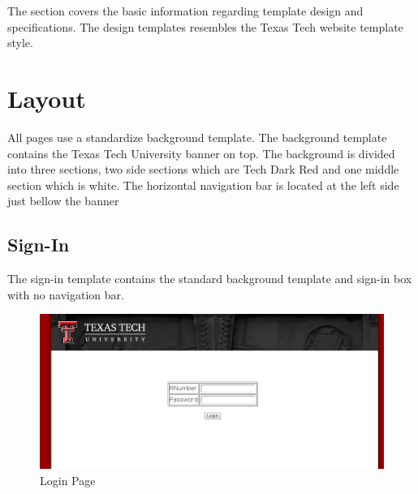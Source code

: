 The section covers the basic information regarding template design and specifications. The design templates resembles the Texas Tech website template style. 
\section{Layout}
All pages use a standardize background template. The background template contains the Texas Tech University banner on top. The background is divided into three sections, two side sections which are Tech Dark Red and one middle section which is white. The horizontal navigation bar is located at the left side just bellow the banner
\subsection{Sign-In}
The sign-in template contains the standard background template and sign-in box with no navigation bar.
\begin{figure}[h!]
  	\centering
  	\includegraphics[scale=0.5]{Login.png}
	\caption{Login Page}
\end{figure}

\newpage
